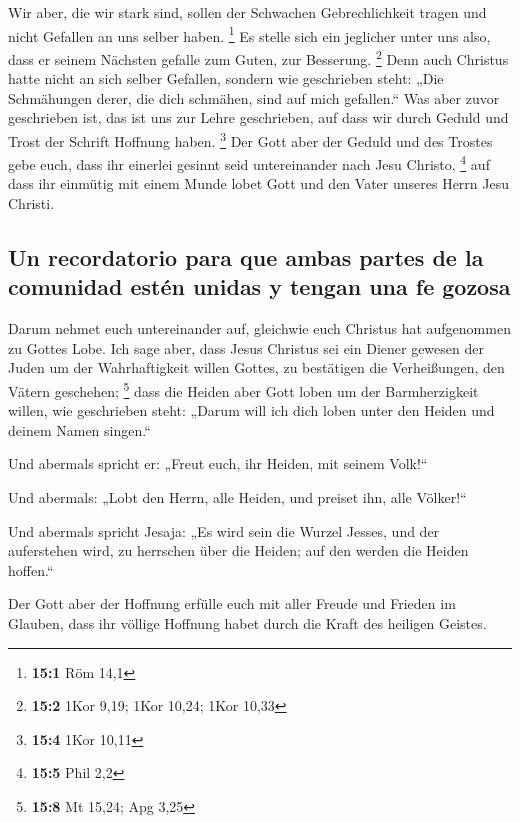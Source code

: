  Wir aber, die wir stark sind, sollen der Schwachen
Gebrechlichkeit tragen und nicht Gefallen an uns selber haben.
\footnote{\textbf{15:1} Röm 14,1}  Es stelle sich ein
jeglicher unter uns also, dass er seinem Nächsten gefalle zum Guten, zur
Besserung. \footnote{\textbf{15:2} 1Kor 9,19; 1Kor 10,24; 1Kor 10,33}
 Denn auch Christus hatte nicht an sich selber Gefallen,
sondern wie geschrieben steht: „Die Schmähungen derer, die dich
schmähen, sind auf mich gefallen.``  Was aber zuvor
geschrieben ist, das ist uns zur Lehre geschrieben, auf dass wir durch
Geduld und Trost der Schrift Hoffnung haben. \footnote{\textbf{15:4}
  1Kor 10,11}  Der Gott aber der Geduld und des Trostes
gebe euch, dass ihr einerlei gesinnt seid untereinander nach Jesu
Christo, \footnote{\textbf{15:5} Phil 2,2}  auf dass ihr
einmütig mit einem Munde lobet Gott und den Vater unseres Herrn Jesu
Christi.

\hypertarget{un-recordatorio-para-que-ambas-partes-de-la-comunidad-estuxe9n-unidas-y-tengan-una-fe-gozosa}{%
\subsection{Un recordatorio para que ambas partes de la comunidad estén
unidas y tengan una fe
gozosa}\label{un-recordatorio-para-que-ambas-partes-de-la-comunidad-estuxe9n-unidas-y-tengan-una-fe-gozosa}}

 Darum nehmet euch untereinander auf, gleichwie euch
Christus hat aufgenommen zu Gottes Lobe.  Ich sage aber,
dass Jesus Christus sei ein Diener gewesen der Juden um der
Wahrhaftigkeit willen Gottes, zu bestätigen die Verheißungen, den Vätern
geschehen; \footnote{\textbf{15:8} Mt 15,24; Apg 3,25} 
dass die Heiden aber Gott loben um der Barmherzigkeit willen, wie
geschrieben steht: „Darum will ich dich loben unter den Heiden und
deinem Namen singen.``

 Und abermals spricht er: „Freut euch, ihr Heiden, mit
seinem Volk!{}``

 Und abermals: „Lobt den Herrn, alle Heiden, und preiset
ihn, alle Völker!{}``

 Und abermals spricht Jesaja: „Es wird sein die Wurzel
Jesses, und der auferstehen wird, zu herrschen über die Heiden; auf den
werden die Heiden hoffen.``

 Der Gott aber der Hoffnung erfülle euch mit aller Freude
und Frieden im Glauben, dass ihr völlige Hoffnung habet durch die Kraft
des heiligen Geistes.

